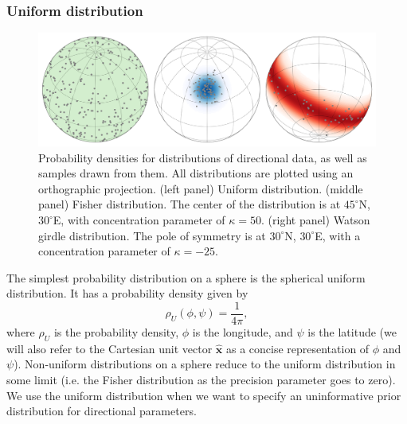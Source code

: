 \documentclass[11pt,letterpaper]{article}
\providecommand{\DIFaddtex}[1]{{\protect\color{blue}\uwave{#1}}} %
\providecommand{\DIFdeltex}[1]{{\protect\color{red}\sout{#1}}}                      %
\providecommand{\DIFaddFL}[1]{\DIFadd{#1}} %
\providecommand{\DIFdelFL}[1]{\DIFdel{#1}} %
\providecommand{\DIFaddbeginFL}{} %
\providecommand{\DIFaddendFL}{} %
\providecommand{\DIFdelbeginFL}{} %
\providecommand{\DIFdelendFL}{} %
\providecommand{\DIFadd}[1]{\texorpdfstring{\DIFaddtex{#1}}{#1}} %
\providecommand{\DIFdel}[1]{\texorpdfstring{\DIFdeltex{#1}}{}} %
\newcommand{\DIFscaledelfig}{0.5}
\newlength{\DIFdelgraphicswidth} %
\newlength{\DIFdelgraphicsheight} %
\newcommand{\DIFaddincludegraphics}[2][]{{\color{blue}\fbox{\DIFOincludegraphics[#1]{#2}}}} %
\newcommand{\DIFdelincludegraphics}[2][]{%
\sbox{\DIFdelgraphicsbox}{\DIFOincludegraphics[#1]{#2}}%
\settoboxwidth{\DIFdelgraphicswidth}{\DIFdelgraphicsbox} %
\settoboxtotalheight{\DIFdelgraphicsheight}{\DIFdelgraphicsbox} %
\scalebox{\DIFscaledelfig}{%
\parbox[b]{\DIFdelgraphicswidth}{\usebox{\DIFdelgraphicsbox}\\[-\baselineskip] \rule{\DIFdelgraphicswidth}{0em}}\llap{\resizebox{\DIFdelgraphicswidth}{\DIFdelgraphicsheight}{%
\setlength{\unitlength}{\DIFdelgraphicswidth}%
\begin{picture}(1,1)%
\thicklines\linethickness{2pt} %
{\color[rgb]{1,0,0}\put(0,0){\framebox(1,1){}}}%
{\color[rgb]{1,0,0}\put(0,0){\line( 1,1){1}}}%
{\color[rgb]{1,0,0}\put(0,1){\line(1,-1){1}}}%
\end{picture}%
}\hspace*{3pt}}} %
} %
\DeclareRobustCommand{\DIFaddbeginFL}{\DIFOaddbeginFL \let\includegraphics\DIFaddincludegraphics} %
\DeclareRobustCommand{\DIFaddendFL}{\DIFOaddendFL \let\includegraphics\DIFOincludegraphics} %
\DeclareRobustCommand{\DIFdelbeginFL}{\DIFOdelbeginFL \let\includegraphics\DIFdelincludegraphics} %
\DeclareRobustCommand{\DIFdelendFL}{\DIFOaddendFL \let\includegraphics\DIFOincludegraphics} %
\begin{document}
\subsubsection*{Uniform distribution}
\begin{figure}
\centering
\includegraphics[width=\textwidth]{fig_direction_distributions.png}
\caption[Spherical probability distributions.]{Probability densities for distributions of directional data, as well as samples drawn from them. All distributions are plotted using an orthographic projection. (left panel) Uniform distribution. (middle panel) Fisher distribution. The center of the distribution is at $45^\circ$N, $30^\circ$E, with concentration parameter of \DIFdelbeginFL \DIFdelFL{$\kappa=50$}\DIFdelendFL \DIFaddbeginFL \DIFaddFL{$\kappa_F=50$}\DIFaddendFL . (right panel) Watson girdle distribution. The pole of symmetry is at $30^\circ$N, $30^\circ$E, with a concentration parameter of \DIFdelbeginFL \DIFdelFL{$\kappa=-25$}\DIFdelendFL \DIFaddbeginFL \DIFaddFL{$\kappa_W=-25$}\DIFaddendFL .}
\label{fig:distributions}
\end{figure}

The simplest probability distribution on a sphere is the spherical uniform distribution. It has a probability density given by
\begin{equation}
  \rho_U(\phi, \psi) = \frac{1}{4 \pi},
\end{equation}
where $\rho_U$ is the probability density, $\phi$ is the longitude, and $\psi$ is the latitude (we will also refer to the Cartesian unit vector $\hat{\mathbf{x}}$ as a concise representation of $\phi$ and $\psi$). Non-uniform distributions on a sphere reduce to the uniform distribution in some limit (i.e. the Fisher distribution as the precision parameter goes to zero). We use the uniform distribution when we want to specify an uninformative prior distribution for directional parameters.
\end{document}
